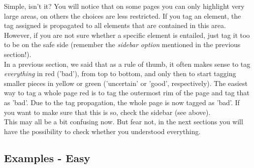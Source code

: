 \documentclass[12pt]{article}
\begin{document}
Simple, isn't it? You will notice that on some pages you can only highlight very large areas, on others the choices are less restricted. If you tag an element, the tag assigned is propagated to all elements that are contained in this area. However, if you are not sure whether a specific element is entailed, just tag it too to be on the safe side (remember the \emph{sidebar option} mentioned in the previous section!).\\

In a previous section, we said that as a rule of thumb, it often makes sense to tag \emph{everything} in red ('bad'), from top to bottom, and only then to start tagging smaller pieces in yellow or green ('uncertain' or 'good', respectively). The easiest way to tag a whole page red is to tag the outermost rim of the page and tag that as 'bad'. Due to the tag propagation, the whole page is now tagged as 'bad'. If you want to make sure that this is so, check the sidebar (see above).\\

This may all be a bit confusing now. But fear not, in the next sections you will have the possibility to check whether you understood everything. \\


\subsection{Examples - Easy}
\label{Examples}
\end{document}
